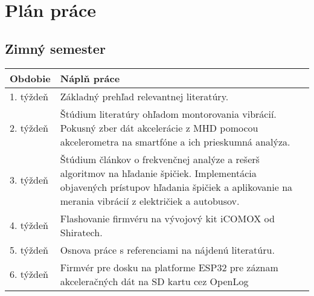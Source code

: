 \thispagestyle{empty}
\chapter{Plán práce}
\renewcommand*{\thepage}{A-\arabic{page}}

\section{Zimný semester}

\begin{table}[h!]
\def\arraystretch{1.25}
\begin{tabular}{|l|p{12cm}|}
\hline
\textbf{Obdobie} & \textbf{Náplň práce}                                                                                                                                                                                                                         \\ \hline
1. týždeň         & Základný prehľad relevantnej literatúry.                                                                                                                                                                                                      \\ \hline
2. týždeň         & Štúdium literatúry ohľadom montorovania vibrácií. Pokusný zber dát akcelerácie z MHD pomocou akcelerometra na smartfóne a ich prieskumná analýza.                                             \\ \hline
3. týždeň         & Štúdium článkov o frekvenčnej analýze a rešerš algoritmov na hľadanie špičiek. Implementácia objavených prístupov hľadania špičiek a aplikovanie na merania vibrácií z električiek a autobusov. \\ \hline
4. týždeň         & Flashovanie firmvéru na vývojový kit iCOMOX od Shiratech.                                                                                                                                                                                                  \\ \hline
5. týždeň         & Osnova práce s referenciami na nájdenú literatúru.                                                                                                                                                                                            \\ \hline
6. týždeň         & Firmvér pre dosku na platforme ESP32 pre záznam akceleračných dát na SD kartu cez OpenLog \\ \hline

\end{tabular}
\end{table}
